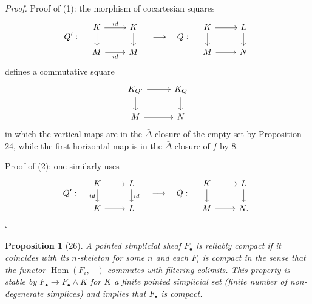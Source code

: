 \documentclass[11pt]{article}
\newcommand{\Hom}{\operatorname{Hom}}
\theoremstyle{deligne}
\newtheorem*{proposition*}{Proposition}
\newenvironment{proofdel}{\noindent\textit{Proof.}}{\hfill$\square$}
\begin{document}
\begin{proofdel}
Proof of (1): the morphism of cocartesian squares
\[
Q':\quad
\begin{tikzcd}[column sep=2.4em,row sep=1.5em]
K \arrow[r,"id"] \arrow[d] & K \arrow[d] \\
M \arrow[r,"id"'] & M
\end{tikzcd}
\quad\longrightarrow\quad
Q:\quad
\begin{tikzcd}[column sep=2.4em,row sep=1.5em]
K \arrow[r] \arrow[d] & L \arrow[d] \\
M \arrow[r] & N
\end{tikzcd}
\]
defines a commutative square
\[
\begin{tikzcd}[column sep=2.8em,row sep=1.6em]
K_{Q'} \arrow[r] \arrow[d] & K_Q \arrow[d] \\
M \arrow[r] & N
\end{tikzcd}
\]
in which the vertical maps are in the \(\bar\Delta\)-closure of the empty set by Proposition 24, while the first horizontal map is in the \(\bar\Delta\)-closure of \(f\) by 8.

Proof of (2): one similarly uses
\[
Q':\quad
\begin{tikzcd}[column sep=2.4em,row sep=1.5em]
K \arrow[r] \arrow[d,"id"'] & L \arrow[d,"id"] \\
K \arrow[r] & L
\end{tikzcd}
\quad\longrightarrow\quad
Q:\quad
\begin{tikzcd}[column sep=2.4em,row sep=1.5em]
K \arrow[r] \arrow[d] & L \arrow[d] \\
M \arrow[r] & N .
\end{tikzcd}
\]
\end{proofdel}

\begin{proposition*}[26]
A pointed simplicial sheaf \(F_\bullet\) is reliably compact if it coincides with its \(n\)-skeleton for some \(n\) and each \(F_i\) is compact in the sense that the functor \(\Hom(F_i,-)\) commutes with filtering colimits. This property is stable by \(F_\bullet\to F_\bullet\wedge K\) for \(K\) a finite pointed simplicial set (finite number of non-degenerate simplices) and implies that \(F_\bullet\) is compact.
\end{proposition*}
\end{document}

